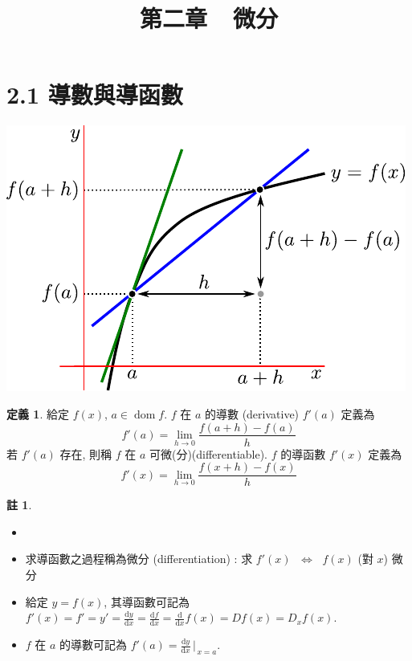 \documentclass[12pt]{extarticle}
\newcommand{\ds}{\displaystyle}
\newcommand{\ifff}{\;\Longleftrightarrow\;}
\DeclareMathOperator*{\dom}{dom}
\theoremstyle{definition}
\newtheorem*{dfn}{定義}
\newtheorem*{rmk}{註}
\begin{document}
\title{\texorpdfstring{\vspace{-16mm} 第二章\ \ 微分}{第二章\ \ 微分}} 
\author{\vspace{-5em}}
\date{\vspace{-5em}}
\maketitle
\thispagestyle{firststyle}


\section*{2.1 導數與導函數}

\begin{minipage}{0.3\textwidth}
  \includegraphics[scale=0.75,page=1]{fig/tangentA.pdf}
\end{minipage}
\quad
\begin{minipage}{0.65\textwidth}
  \begin{dfn}
    給定 $f(x)$, $a\in\dom f$. $f$ 在 $a$ 的導數 (derivative) $f'(a)$ 定義為 $$f'(a) = \lim_{h\to 0}\frac{f(a + h) - f(a)}{h}$$ 若 $f'(a)$ 存在, 則稱 $f$ 在 $a$ 可微(分)(differentiable). $f$ 的導函數 $f'(x)$ 定義為 $$f'(x) = \lim_{h\to 0}\frac{f(x + h) - f(x)}{h}$$ 
  \end{dfn}
\end{minipage}

\begin{rmk}
  \begin{itemize}\setlength\itemsep{0em}
    \item[]
    \item 求導函數之過程稱為微分 (differentiation) : 求 $f'(x)$ $\ifff$ $f(x)$ (對 $x$) 微分
    \item 給定 $y = f(x)$, 其導函數可記為 $\ds f'(x) = f' = y' = \frac{\text{d}y}{\text{d}x} = \frac{\text{d}f}{\text{d}x} = \frac{\text{d}}{\text{d}x} f(x) = Df(x) = D_x f(x)$. 
    \item $f$ 在 $a$ 的導數可記為 $\ds f'(a) = \frac{\text{d}y}{\text{d}x}\,\bigg|_{\,x = a}$.  
  \end{itemize}
\end{rmk}
\end{document}
